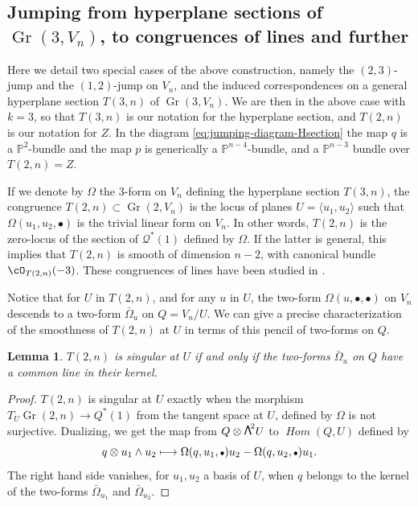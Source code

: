\documentclass[JEP,XML,SOM,Unicode,NoEqCountersInSection]{cedram}
\newcommand{\sbullet}{{\scriptstyle\bullet}}
\newcommand\bw[1]{{\hbox{\large$\mathsf{\Lambda}$}^{\!#1}}}
\newcommand\mto{\mathchoice{\longmapsto}{\mapsto}{\mapsto}{\mapsto}}
\DeclareMathOperator{\iHom}{\mathit{Hom}}
\let\mathcal\mathscr
\theoremstyle{plain}
\newtheorem{lemma}[theorem]{Lemma}
\theoremstyle{definition}
\DeclareMathOperator{\Gr}{Gr}
\newcommand{\PP}{\mathbb{P}}
\newcommand{\sheaf}[1]{\mathcal{#1}}
\newcommand{\kq}{\sheaf{Q}}
\begin{document}
\subsection{Jumping from hyperplane sections of $\Gr(3,V_n)$, to congruences of lines and further}

Here we detail two special cases of the above construction, namely the $(2,3)$-jump and the $(1,2)$-jump on $V_n$, and the induced correspondences on a general hyperplane section $T(3,n)$ of $\Gr(3,V_n)$. We are then in the above case with $k=3$, so that $T(3,n)$ is our notation for the hyperplane section, and $T(2,n)$ is our notation for $Z$. In the diagram \eqref{eq:jumping-diagram-Hsection} the map $q$ is a $\PP^2$-bundle and the map $p$ is generically a $\PP^{n-4}$-bundle, and a $\PP^{n-3}$ bundle over $T(2,n)=Z$.

If we denote by $\Omega$ the $3$-form on $V_n$ defining the hyperplane section $T(3,n)$, the congruence $T(2,n) \subset \Gr(2,V_n)$ is the locus of planes $U=\langle
u_1, u_2\rangle$ such that $\Omega(u_1,u_2,\sbullet)$ is the trivial linear form on $V_n$. In other
words, $T(2,n)$ is the zero-locus of the section of $\kq^*(1)$ defined by $\Omega$. If the latter
is general, this implies that $T(2,n)$ is smooth of dimension $n-2$, with canonical bundle
$\cO_{T(2,n)}(-3)$. These congruences of lines have been studied in \cite{dpfmr}.

Notice that for $U$ in $T(2,n)$, and for any $u$ in $U$, the two-form $\Omega(u,\sbullet,\sbullet)$ on $V_n$
descends to a two-form $\bar\Omega_u$ on $Q=V_n/U$. We can give a precise characterization of the smoothness of $T(2,n)$ at $U$ in terms of this pencil of two-forms on $Q$.

\begin{lemma}
$T(2,n)$ is singular at $U$ if and only if the two-forms $\bar\Omega_u$ on $Q$ have
a common line in their kernel.
\end{lemma}

\begin{proof}
$T(2,n)$ is singular at $U$ exactly when the morphism $T_U\Gr(2,n)\to Q^*(1)$ from the tangent space at $U$, defined
by $\Omega$ is not surjective. Dualizing, we get the map from $Q\otimes\bw2U$
to $\iHom(Q,U)$ defined by\vspace*{-3pt}\enlargethispage{\baselineskip}%
\[
q\otimes u_1\wedge u_2 \mto \Omega(q,u_1,\sbullet)u_2-\Omega(q,u_2,\sbullet)u_1.
\]
The right hand side vanishes, for $u_1, u_2$ a basis of $U$, when $q$ belongs to the
kernel of the two-forms $\bar\Omega_{u_1}$ and $\bar\Omega_{u_2}$.\end{proof}
\end{document}
